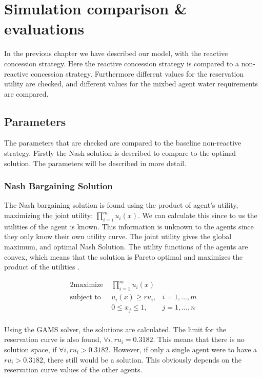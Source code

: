 \chapter{Simulation comparison \& evaluations}
\label{ch:eval}
In the previous chapter we have described our model, with the reactive concession strategy. Here the reactive concession strategy is compared to a non-reactive concession strategy. Furthermore different values for the reservation utility are checked, and different values for the mixbed agent water requirements are compared. 

\section{Parameters}
The parameters that are checked are compared to the baseline non-reactive strategy. Firstly the Nash solution is described to compare to the optimal solution. The parameters will be described in more detail.

\subsection{Nash Bargaining Solution}
The Nash bargaining solution is found using the product of agent's utility, maximizing the joint utility: $\prod_{i=i}^{m}u_i(x).$ We can calculate this since to us the utilities of the agent is known. This information is unknown to the agents since they only know their own utility curve. The joint utility gives the global maximum, and optimal Nash Solution. The utility functions of the agents are convex, which means that the solution is Pareto optimal and maximizes the product of the utilities \citep{nash1950bargaining, roth1977individual, lensberg1988stability}. 

\begin{alignat*}{2}
\text{maximize }   	& \prod_{i=1}^m u_i(x)  \\
\text{subject to \ } 	& u_i(x) \geq ru_i, & i = 1,...,m\\
& 0\leq x_j\leq 1, & j = 1,...,n\\
\end{alignat*}

Using the GAMS solver, the solutions are calculated. The limit for the reservation curve is also found, $\forall i,  ru_i = 0.3182$. This means that there is no solution space, if $\forall i, ru_i > 0.3182$. However, if only a single agent were to have a $ru_i > 0.3182$, there still would be a solution. This obviously depends on the reservation curve values of the other agents. 

